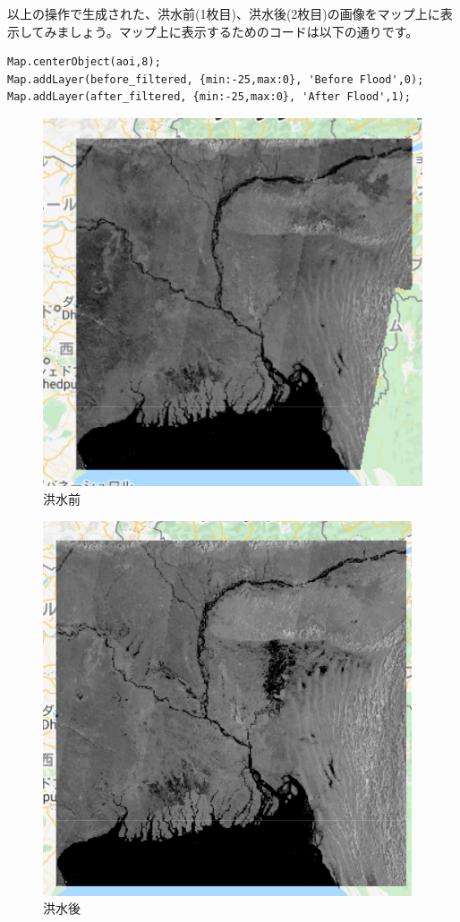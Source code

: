 \documentclass[
]{book}
\begin{document}
以上の操作で生成された、洪水前(1枚目)、洪水後(2枚目)の画像をマップ上に表示してみましょう。マップ上に表示するためのコードは以下の通りです。

\begin{verbatim}
Map.centerObject(aoi,8);
Map.addLayer(before_filtered, {min:-25,max:0}, 'Before Flood',0);
Map.addLayer(after_filtered, {min:-25,max:0}, 'After Flood',1);
\end{verbatim}

\begin{figure}
\centering
\includegraphics{images/flood1.png}
\caption{洪水前}
\end{figure}

\begin{figure}
\centering
\includegraphics{images/flood2.png}
\caption{洪水後}
\end{figure}
\end{document}
